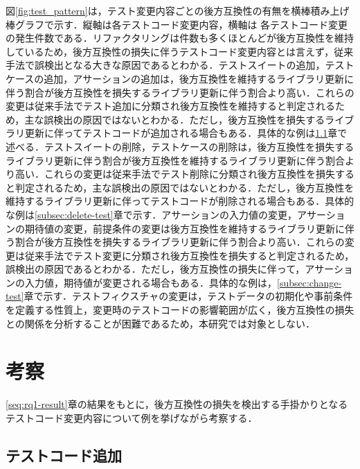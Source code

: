 \documentclass[11pt,dvipdfmx]{jreport}
\begin{document}
図\ref{fig:test_pattern}は，テスト変更内容ごとの後方互換性の有無を横棒積み上げ棒グラフで示す．縦軸は各テストコード変更内容，横軸は
各テストコード変更の発生件数である．リファクタリングは件数も多くほとんどが後方互換性を維持しているため，後方互換性の損失に伴うテストコード変更内容とは言えず，従来手法で誤検出となる大きな原因であるとわかる．テストスイートの追加，テストケースの追加，アサーションの追加は，後方互換性を維持するライブラリ更新に伴う割合が後方互換性を損失するライブラリ更新に伴う割合より高い．これらの変更は従来手法でテスト追加に分類され後方互換性を維持すると判定されるため，主な誤検出の原因ではないとわかる．ただし，後方互換性を損失するライブラリ更新に伴ってテストコードが追加される場合もある．具体的な例は\ref{subsec:add-test}章で述べる．テストスイートの削除，テストケースの削除は，後方互換性を損失するライブラリ更新に伴う割合が後方互換性を維持するライブラリ更新に伴う割合より高い．これらの変更は従来手法でテスト削除に分類され後方互換性を損失すると判定されるため，主な誤検出の原因ではないとわかる．ただし，後方互換性を維持するライブラリ更新に伴ってテストコードが削除される場合もある．具体的な例は\ref{subsec:delete-test}章で示す．アサーションの入力値の変更，アサーションの期待値の変更，前提条件の変更は後方互換性を維持するライブラリ更新に伴う割合が後方互換性を損失するライブラリ更新に伴う割合より高い．これらの変更は従来手法でテスト変更に分類され後方互換性を損失すると判定されるため，誤検出の原因であるとわかる．ただし，後方互換性の損失に伴って，アサーションの入力値，期待値が変更される場合もある．具体的な例は，\ref{subsec:change-test}章で示す．テストフィクスチャの変更は，テストデータの初期化や事前条件を定義する性質上，変更時のテストコードの影響範囲が広く，後方互換性の損失との関係を分析することが困難であるため，本研究では対象としない．

\section{考察}
\ref{seq:rq1-result}章の結果をもとに，後方互換性の損失を検出する手掛かりとなるテストコード変更内容について例を挙げながら考察する．

\subsection{テストコード追加}\label{subsec:add-test}
\end{document}
